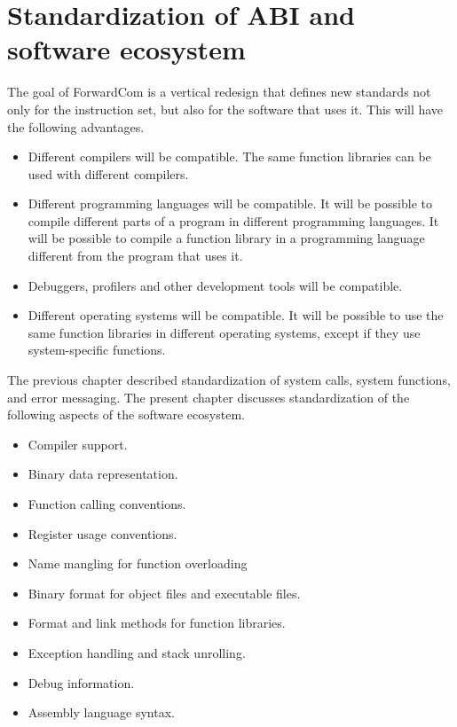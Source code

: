 \documentclass[forwardcom.tex]{subfiles}
\begin{document}
\RaggedRight

\chapter{Standardization of ABI and software ecosystem} \label{StandardizationOfAbi}
The goal of ForwardCom is a vertical redesign that defines new standards not only for the instruction set, but also for the software that uses it. This will have the following advantages.

\begin{itemize}
\item Different compilers will be compatible. The same function libraries can be used with different compilers. 

\item Different programming languages will be compatible. It will be possible to compile different parts of a program in different programming languages. It will be possible to compile a function library in a programming language different from the program that uses it. 

\item Debuggers, profilers and other development tools will be compatible. 

\item Different operating systems will be compatible. It will be possible to use the same function libraries in different operating systems, except if they use system-specific functions. 
\end{itemize}

The previous chapter described standardization of system calls, system functions, and error messaging. The present chapter discusses standardization of the following aspects of the software ecosystem. 

\begin{itemize}
\item Compiler support. 

\item Binary data representation. 

\item Function calling conventions. 

\item Register usage conventions.

\item Name mangling for function overloading

\item Binary format for object files and executable files.

\item Format and link methods for function libraries.

\item Exception handling and stack unrolling.

\item Debug information.

\item Assembly language syntax. 

\end{itemize}
\end{document}

